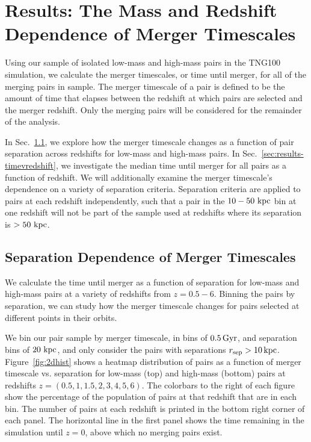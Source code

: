 \documentclass[twocolumn,linenumbers]{aastex631}
\begin{document}
\section{Results: The Mass and Redshift Dependence of Merger Timescales}\label{sec:results}
    Using our sample of isolated low-mass and high-mass pairs in the TNG100 simulation, we calculate the merger timescales, or time until merger, for all of the merging pairs in sample. 
    The merger timescale of a pair is defined to be the amount of time that elapses between the redshift at which pairs are selected and the merger redshift.
    Only the merging pairs will be considered for the remainder of the analysis. 
    
    
    In Sec.~\ref{sec:results-timevsep}, we explore how the merger timescale changes as a function of pair separation across redshifts for low-mass and high-mass pairs. 
    In Sec.~\ref{sec:results-timevredshift}, we investigate the median time until merger for all pairs as a function of redshift. 
    We will additionally examine the merger timescale's dependence on a variety of separation criteria. 
    Separation criteria are applied to pairs at each redshift independently, such that a pair in the $10-50\,\mathrm{\,kpc}$ bin at one redshift will not be part of the sample used at redshifts where its separation is $>50\,\mathrm{\,kpc}$.



\subsection{Separation Dependence of Merger Timescales}\label{sec:results-timevsep}
    We calculate the time until merger as a function of separation for low-mass and high-mass pairs at a variety of redshifts from $z=0.5-6$. 
    Binning the pairs by separation, we can study how the merger timescale changes for pairs selected at different points in their orbits. 
    
    We bin our pair sample by merger timescale, in bins of $0.5\mathrm{\,Gyr}$, and separation bins of $20\,\mathrm{\,kpc}$, and only consider the pairs with separations $r_{\mathrm{sep}}>10\mathrm{\,kpc}$.
    Figure~\ref{fig:2dhist} shows a heatmap distribution of pairs as a function of merger timescale vs. separation for low-mass (top) and high-mass (bottom) pairs at redshifts $z=(0.5,1,1.5,2,3,4,5,6)$. 
    The colorbars to the right of each figure show the percentage of the population of pairs at that redshift that are in each bin.
    The number of pairs at each redshift is printed in the bottom right corner of each panel.
    The horizontal line in the first panel shows the time remaining in the simulation until $z=0$, above which no merging pairs exist.
    
\end{document}
